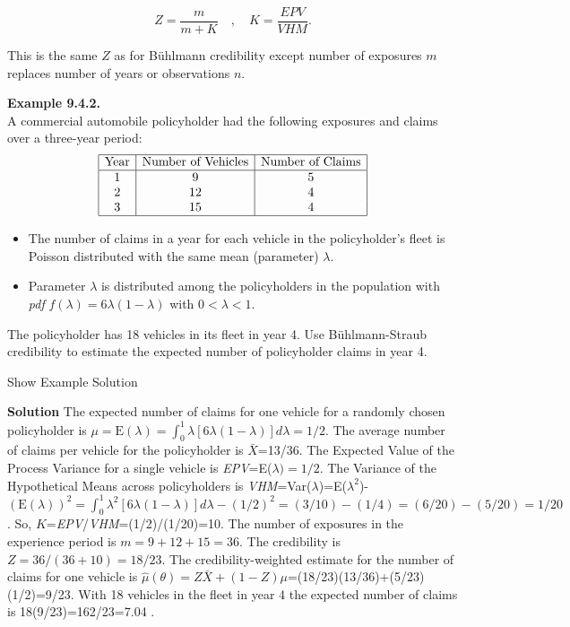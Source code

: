\documentclass[]{book}
\providecommand{\tightlist}{%
  \setlength{\itemsep}{0pt}\setlength{\parskip}{0pt}}
\theoremstyle{definition}
\theoremstyle{definition}
\theoremstyle{definition}
\theoremstyle{remark}
\begin{document}
\begin{equation}
Z=\frac{m}{m+K} \quad , \quad K =\frac{EPV}{VHM}. 
\label{eq:bsZ} 
\end{equation}

This is the same \(Z\) as for Bühlmann credibility except number of
exposures \(m\) replaces number of years or observations \(n\).

\textbf{Example 9.4.2.}\\
A commercial automobile policyholder had the following exposures and
claims over a three-year period: \[\begin{matrix}
\begin{array}{|c|c|c|}
\hline
\text{Year} & \text{Number of Vehicles} & \text{Number of Claims} \\
\hline
1 &   9 &  5  \\
2 & 12 &  4  \\  
3 & 15 &  4  \\              
\hline
\end{array}
\end{matrix}\]

\begin{itemize}
\tightlist
\item
  The number of claims in a year for each vehicle in the policyholder's
  fleet is Poisson distributed with the same mean (parameter)
  \(\lambda\).
\item
  Parameter \(\lambda\) is distributed among the policyholders in the
  population with \emph{pdf} \(f(\lambda)=6\lambda(1-\lambda)\) with
  \(0<\lambda<1\).
\end{itemize}

The policyholder has 18 vehicles in its fleet in year 4. Use
Bühlmann-Straub credibility to estimate the expected number of
policyholder claims in year 4.

Show Example Solution

\hypertarget{toggleExampleCred.4.2}{}
\textbf{Solution} The expected number of claims for one vehicle for a
randomly chosen policyholder is
\(\mu=\mathrm{E}(\lambda)=\int_{0}^{1} \lambda[6\lambda(1-\lambda)] d\lambda=1/2\).
The average number of claims per vehicle for the policyholder is
\(\bar{X}\)=13/36. The Expected Value of the Process Variance for a
single vehicle is \emph{EPV}=E(\(\lambda)=1/2\). The Variance of the
Hypothetical Means across policyholders is
\emph{VHM}=Var(\(\lambda\))=E(\(\lambda^2\))-\((\mathrm{E}(\lambda))^2=\int_{0}^{1} \lambda^2[6\lambda(1-\lambda)] d\lambda-(1/2)^2=(3/10)-(1/4)=(6/20)-(5/20)=1/20\).
So, \(K\)=\emph{EPV}/\emph{VHM}=(1/2)/(1/20)=10. The number of exposures
in the experience period is \(m=9+12+15=36\). The credibility is
\(Z=36/(36+10)=18/23\). The credibility-weighted estimate for the number
of claims for one vehicle is
\(\hat{\mu}(\theta)=Z\bar{X}+(1-Z)\mu\)=(18/23)(13/36)+(5/23)(1/2)=9/23.
With 18 vehicles in the fleet in year 4 the expected number of claims is
18(9/23)=162/23=7.04 .
\end{document}
